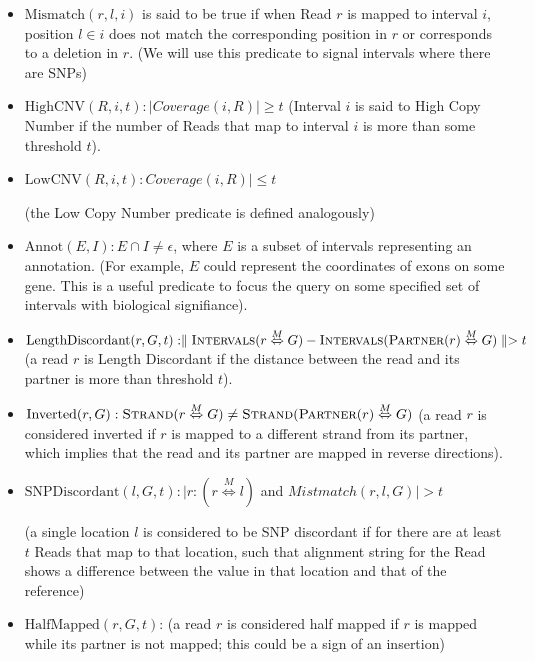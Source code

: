 \documentclass[10pt,fullpage]{article}
\def\ensuretext{\textrm}
\newcommand{\Intervals}{\ensuretext{{\sc Intervals}}}
\newcommand{\Strand}{\ensuretext{{\sc Strand}}}
\newcommand{\Partner}{\ensuretext{{\sc Partner}}}
\newcommand{\MapRel}{\ensuremath{\stackrel{M}{\Leftrightarrow}}}
\begin{document}
\begin{itemize}

\item
$\mbox{Mismatch}(r,l, i)$ is said to be true if when 
Read $r$ is mapped to interval $i$, position $l \in i$ 
does not match the corresponding position in $r$ or
corresponds to a deletion in $r$.  (We will use this
predicate to signal intervals where there are SNPs)

\item 

$\mbox{HighCNV}(R,i,t):|Coverage(i, R)| \ge t$
(Interval $i$ is said to High Copy Number
if the number of {\sc Reads} that map to interval $i$ is
more than some threshold $t$).

\item $\mbox{LowCNV}(R,i,t): Coverage(i, R)| \leq t$

(the Low Copy Number predicate is defined analogously)

\item $\mbox{Annot}(E,I): E\cap I\ne \epsilon$, where $E$ is a subset
  of intervals representing an annotation. (For example, 
$E$ could represent the coordinates of exons on some gene.  This
is a useful predicate to focus the query on some specified 
set of intervals with biological signifiance).

\item $\mbox{LengthDiscordant}(r,G,t): \parallel \Intervals(r\MapRel G)-\Intervals(\Partner(r)\MapRel G)\parallel>t$
(a read $r$ is Length Discordant if the distance
between the read and its partner is more than threshold $t$).

\item $\mbox{Inverted}(r,G): \Strand(r\MapRel G) \ne \Strand (\Partner(r)\MapRel G)$
(a read $r$ is considered inverted if $r$ is mapped to
a different strand from its partner, which implies that the
read and its partner are mapped in reverse directions).



\item $\mbox{SNPDiscordant}(l,G,t): |r: (r\MapRel l)$ and
$Mistmatch (r, l, G)| > t$ 

(a single location $l$ is considered to be SNP discordant if 
for there are at least $t$ Reads that map to that location, 
such that alignment string for the Read shows a difference 
between the value in that location and that of the reference)

\item $\mbox{HalfMapped}(r,G,t)$: (a read $r$ is considered 
half mapped if $r$ is mapped while its partner is not mapped;
this could be a sign of an insertion)


\end{itemize}
\end{document}
